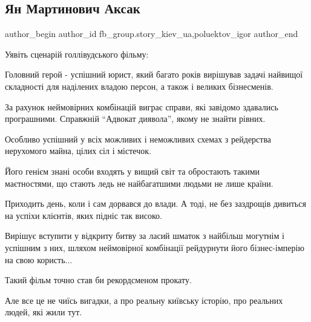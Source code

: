  
 
 
 
 
 
\subsection{Ян Мартинович Аксак}
\label{sec:30_11_2021.fb.fb_group.story_kiev_ua.2.aksak}
 
\ifcmt
 author_begin
   author_id fb_group.story_kiev_ua,poluektov_igor
 author_end
\fi

Уявіть сценарій голлівудського фільму:

Головний герой - успішний юрист, який багато років вирішував задачі найвищої
складності для наділених владою персон, а також і великих бізнесменів.


За рахунок неймовірних комбінацій виграє справи, які завідомо здавались
програшними. Справжній \enquote{Адвокат диявола}, якому не знайти рівних.

Особливо успішний у всіх можливих і неможливих схемах з рейдерства нерухомого
майна, цілих сіл і містечок.

Його генієм знані особи входять у вищий світ та обростають такими маєтностями,
що стають ледь не найбагатшими людьми не лише країни.


Приходить день, коли і сам дорвався до влади. А тоді, не без заздрощів дивиться
на успіхи клієнтів, яких підніс так високо. 

Вирішує вступити у відкриту битву за ласий шматок з найбільш могутнім і
успішним з них, шляхом неймовірної комбінації рейдурнути його бізнес-імперію на
свою користь...

Такий фільм точно став би рекордсменом прокату.

Але все це не чиїсь вигадки, а про реальну київську історію, про реальних
людей, які жили тут.

